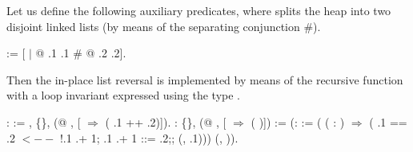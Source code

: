 \begin{exercise}
Let us define the following auxiliary predicates, where 
splits the heap into two disjoint linked lists (by means of the
separating conjunction \#).
\begin{coqdoccode}
\coqdocemptyline
\coqdocnoindent
{}     := [  \ensuremath{|}   @  .1 .1 \# @  .2 .2].\coqdoceol
\coqdocemptyline
\end{coqdoccode}


\noindent
Then the in-place list reversal is implemented by means of the
recursive function  with a loop invariant expressed using the
type .
\begin{coqdoccode}
\coqdocemptyline
\coqdocnoindent
{}   :  := \coqdoceol
\coqdocindent{1.00em}
\coqdockw{\ensuremath{\forall}} , \{\},  (@   , [  \ensuremath{\Rightarrow}   ( .1 ++ .2)]).\coqdoceol
\coqdocemptyline
\coqdocnoindent
{} \coqdoceol
\coqdocnoindent
{}   : \{\},  (@   , [  \ensuremath{\Rightarrow}   ( )]) :=\coqdoceol
\coqdocindent{1.00em}
 (:  :=  ( ( :  )  \ensuremath{\Rightarrow} \coqdoceol
\coqdocindent{12.00em}
 ( .1 ==    .2 \coqdoceol
\coqdocindent{14.00em}
  $\mathtt{<--}$ !.1 .+ 1;\coqdoceol
\coqdocindent{16.50em}
.1 .+ 1 ::= .2;;\coqdoceol
\coqdocindent{16.50em}
 (, .1)))\coqdoceol
\coqdocindent{3.00em}
  (, )).\coqdoceol
\coqdocemptyline
\end{coqdoccode}



\end{exercise}
